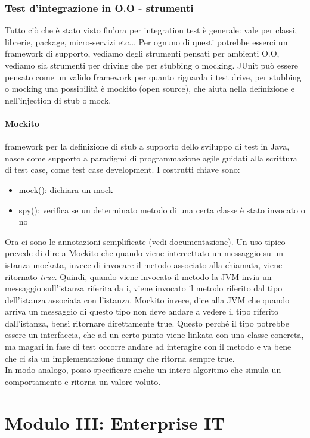 \documentclass{article}
\begin{document}
\subsubsection{Test d'integrazione in O.O - strumenti}
Tutto ciò che è stato visto fin'ora per integration test è generale: vale per classi, librerie, package, micro-servizi etc... Per ognuno di questi potrebbe esserci un framework di supporto, vediamo degli strumenti pensati per ambienti O.O, vediamo sia strumenti per driving che per stubbing o mocking. JUnit può essere pensato come un valido framework per quanto riguarda i test drive, per stubbing o mocking una possibilità è mockito (open source), che aiuta nella definizione e nell'injection di stub o mock.
\paragraph{Mockito}framework per la definizione di stub a supporto dello sviluppo di test in Java, nasce come supporto a paradigmi di programmazione agile guidati alla scrittura di test case, come test case development. I costrutti chiave sono:
\begin{itemize}
\item mock(): dichiara un mock
\item spy(): verifica se un determinato metodo di una certa classe è stato invocato o no
\end{itemize}
Ora ci sono le annotazioni semplificate (vedi documentazione). Un uso tipico prevede di dire a Mockito che quando viene intercettato un messaggio su un istanza mockata, invece di invocare il metodo associato alla chiamata, viene ritornato \textit{true}. Quindi, quando viene invocato il metodo la JVM invia un messaggio sull'istanza riferita da i, viene invocato il metodo riferito dal tipo dell'istanza associata con l'istanza. Mockito invece, dice alla JVM che quando arriva un messaggio di questo tipo non deve andare a vedere il tipo riferito dall'istanza, bensì ritornare direttamente true. Questo perché il tipo potrebbe essere un interfaccia, che ad un certo punto viene linkata con una classe concreta, ma magari in fase di test occorre andare ad interagire con il metodo e va bene che ci sia un implementazione dummy che ritorna sempre true.\\ In modo analogo, posso specificare anche un intero algoritmo che simula un comportamento e ritorna un valore voluto.




\newpage
\section{Modulo III: Enterprise IT}
\end{document}
